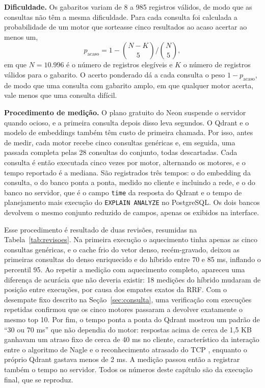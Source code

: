 \documentclass[12pt,oneside,a4paper,english,brazil]{abntex2}
\newcommand{\campo}[1]{\texttt{#1}}
\begin{document}
\textbf{Dificuldade.} Os gabaritos variam de 8 a 985 registros válidos, de modo que as consultas não têm a mesma dificuldade. Para cada consulta foi calculada a probabilidade de um motor que sorteasse cinco resultados ao acaso acertar ao menos um,
\begin{equation}
  p_{\text{acaso}} = 1 - \binom{N - K}{5} \Big/ \binom{N}{5},
\end{equation}
em que $N = 10.996$ é o número de registros elegíveis e $K$ o número de registros válidos para o gabarito. O acerto ponderado dá a cada consulta o peso $1 - p_{\text{acaso}}$, de modo que uma consulta com gabarito amplo, em que qualquer motor acerta, vale menos que uma consulta difícil.

\textbf{Procedimento de medição.} O plano gratuito do Neon suspende o servidor quando ocioso, e a primeira consulta depois disso leva segundos. O Qdrant e o modelo de embeddings também têm custo de primeira chamada. Por isso, antes de medir, cada motor recebe cinco consultas genéricas e, em seguida, uma passada completa pelas 28 consultas do conjunto, todas descartadas. Cada consulta é então executada cinco vezes por motor, alternando os motores, e o tempo reportado é a mediana. São registrados três tempos: o do embedding da consulta, o do banco ponta a ponta, medido no cliente e incluindo a rede, e o do banco no servidor, que é o campo \campo{time} da resposta do Qdrant e o tempo de planejamento mais execução do \campo{EXPLAIN ANALYZE} no PostgreSQL. Os dois bancos devolvem o mesmo conjunto reduzido de campos, apenas os exibidos na interface.

Esse procedimento é resultado de duas revisões, resumidas na Tabela~\ref{tab:revisoes}. Na primeira execução o aquecimento tinha apenas as cinco consultas genéricas, e o cache frio do vetor denso, recém-gravado, deixou as primeiras consultas do denso enriquecido e do híbrido entre 70 e 85 ms, inflando o percentil 95. Ao repetir a medição com aquecimento completo, apareceu uma diferença de acurácia que não deveria existir: 18 medições do híbrido mudaram de posição entre execuções, por causa dos empates exatos da RRF. Com o desempate fixo descrito na Seção~\ref{sec:consulta}, uma verificação com execuções repetidas confirmou que os cinco motores passaram a devolver exatamente o mesmo top 10. Por fim, o tempo ponta a ponta do Qdrant mostrou um padrão de ``30 ou 70 ms'' que não dependia do motor: respostas acima de cerca de 1,5 KB ganhavam um atraso fixo de cerca de 40 ms no cliente, característico da interação entre o algoritmo de Nagle e o reconhecimento atrasado do TCP \cite{rfc896,rfc1122}, enquanto o próprio Qdrant gastava menos de 2 ms. A medição passou então a registrar também o tempo no servidor. Todos os números deste capítulo são da execução final, que se reproduz.
\end{document}
